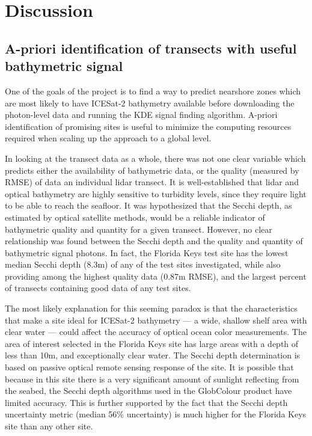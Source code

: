 \chapter{Discussion}

\section{A-priori identification of transects with useful bathymetric signal}
One of the goals of the project is to find a way to predict nearshore zones which are most likely to have ICESat-2 bathymetry available before downloading the photon-level data and running the KDE signal finding algorithm. A-priori identification of promising sites is useful to minimize the computing resources required when scaling up the approach to a global level.

In looking at the transect data as a whole, there was not one clear variable which predicts either the availability of bathymetric data, or the quality  (measured by RMSE) of data an individual lidar transect. It is well-established that lidar and optical bathymetry are highly sensitive to turbidity levels, since they require light to be able to reach the seafloor. It was hypothesized that the Secchi depth, as estimated by optical satellite methods, would be a reliable indicator of bathymetric quality and quantity for a given transect. However, no clear relationship was found between the Secchi depth and the quality and quantity of bathymetric signal photons. In fact, the Florida Keys test site has the lowest median Secchi depth (8.3m) of any of the test sites investigated, while also providing among the highest quality data (0.87m RMSE), and the largest percent of transects containing good data of any test sites.

The most likely explanation for this seeming paradox is that the characteristics that make a site ideal for ICESat-2 bathymetry --- a wide, shallow shelf area with clear water --- could affect the accuracy of optical ocean color measurements. The area of interest selected in the Florida Keys site has large areas with a depth of less than 10m, and exceptionally clear water. The Secchi depth determination is based on passive optical remote sensing response of the site. It is possible that because in this site there is a very significant amount of sunlight reflecting from the seabed, the Secchi depth algorithms used in the GlobColour product have limited accuracy. This is further supported by the fact that the Secchi depth uncertainty metric (median 56\% uncertainty) is much higher for the Florida Keys site than any other site. 


